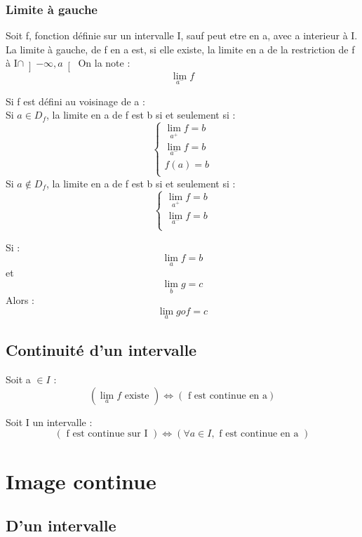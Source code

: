 \subsubsection{Limite à gauche}
\begin{de}
Soit f, fonction définie sur un intervalle I, sauf peut etre en a, avec a interieur à I.\\
La limite à gauche, de f en a est, si elle existe, la limite en a de la restriction de f à I$\cap \left]-\infty,a \right[$
On la note : 
$$\lim_{a^-} f$$
\end{de}
\begin{prop}
Si f est défini au voisinage de a : \\
Si $a \in D_f$, la limite en a de f est b si et seulement si :
$$\left\{\begin{array}{l}
   \underset{a^+}\lim f = b\\
   \underset{a^-}\lim f = b\\
   f(a)=b\\
\end{array}\right.$$
Si $a \notin D_f$, la limite en a de f est b si et seulement si :
$$\left\{\begin{array}{l}
   \underset{a^+}\lim f = b\\
   \underset{a^-}\lim f = b\\
\end{array}\right.$$
\end{prop}
\begin{prop}
Si :
$$\lim_a f = b$$
et 
$$\lim_b g = c$$
Alors :
$$\lim_a gof = c$$
\end{prop}
\subsection{Continuité d'un intervalle}
\begin{prop}
Soit a $\in I$ :
$$(\lim_a f \mbox{ existe }) \Leftrightarrow (\mbox{ f est continue en a})$$
\end{prop}
\begin{prop}
Soit I un intervalle : 
$$(\mbox{ f est continue sur I }) \Leftrightarrow ( \forall a \in I, \mbox{ f est continue en a })$$
\end{prop}
\section{Image continue}
\subsection{D'un intervalle}
